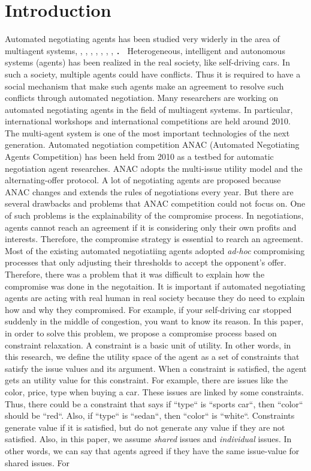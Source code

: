 \documentclass[paper]{ieice}
\begin{document}
\section{Introduction}
%
Automated negotiating agents has been studied very widerly in the area of multiagent systems\cite{bai2017multi}, \cite{fukuta2016recent}, \cite{fujita2015next}, \cite{marsa2014novel}, \cite{ito2013complex}, \cite{ito2011new}, \cite{ito2010innovations}, \cite{ito2009advances}, \cite{ito2008rational}． Heterogeneous, intelligent and autonomous systems (agents) has been realized in the real society, like self-driving cars. In such a society, multiple agents could have conflicts. Thus it is required to have a social mechanism that make such agents make an agreement to resolve such conflicts through automated negotiation. Many researchers are working on automated negotiating agents in the field of multiagent systems. In particular, international workshops and international competitions are held around 2010. The multi-agent system is one of the most  important technologies of the next generation. Automated negotiation competition ANAC (Automated Negotiating Agents Competition) has been held from 2010 as a testbed for automatic negotiation agent researches. ANAC adopts the multi-issue utility model and the alternating-offer protocol. A lot of negotiating agents are proposed because ANAC changes and extends the rules of negotiations every year. But there are several drawbacks and problems that ANAC competition could not focus on. One of such problems is the explainability of the compromise process. In negotiations,  agents cannot reach an agreement if it is considering only their own profits and interests. Therefore, the compromise strategy is essential to rearch an agreement. Most of the existing automated negotiatiing agents adopted {\it ad-hoc} compromising processes that only adjusting their thresholds to accept the opponent’s offer. Therefore, there was a problem that it was difficult to explain how the compromise was done in the negotaition. It is important if automated negotiating agents are acting with real human in real society because they do need to explain how and why they compromised. For example, if your self-driving car stopped suddenly in the middle of congestion, you want to know its reason. In this paper, in order to solve this problem, we propose a compromise process based on constraint relaxation. A constraint is a basic unit of utility. In other words, in this research, we define the utility space of the agent as a set of constraints that satisfy the issue values and its argument. When a constraint is satisfied, the agent gets an utility value for this constraint. For example, there are issues like the color, price, type when buying a car. These issues are linked by some constraints. Thus, there could be a constraint that says if ``type`` is ``sports car``, then ``color`` should be ``red``. Also, if ``type`` is ``sedan``, then ``color`` is ``white``. Constraints generate value if it is satisfied, but do not generate any value if they are not satisfied. Also, in this paper, we assume {\it shared} issues and {\it individual} issues. In other words, we can say that agents agreed if they have the same issue-value for shared issues. For 
\end{document}
